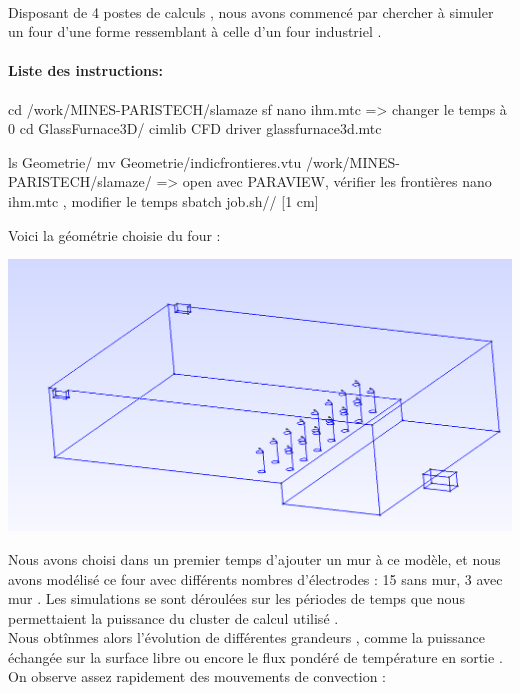 \documentclass[12pt, a4paper, french, BCOR = 0pt, DIV = 10]{scrartcl}
\begin{document}
	\paragraph{}
	 Disposant de 4 postes de calculs , nous avons commencé par chercher à simuler un four  d'une forme ressemblant à celle d'un four industriel .
	 
	 \paragraph{Liste des instructions:}
	 cd /work/MINES-PARISTECH/slamaze
	 sf
	 nano ihm.mtc => changer le temps à 0
	 cd GlassFurnace3D/
	 cimlib CFD driver glassfurnace3d.mtc
	 
	 ls Geometrie/
	 mv Geometrie/indicfrontieres.vtu /work/MINES-PARISTECH/slamaze/ => open avec PARAVIEW, vérifier les frontières
	 nano ihm.mtc , modifier le temps
	 sbatch job.sh// [1 cm]
	 
	 Voici la géométrie choisie du four :
	 
	 \includegraphics[scale=0.5]{Géométrie fours}
	 
	 Nous avons choisi dans un premier temps d'ajouter un mur à ce modèle, et nous avons modélisé ce four avec différents nombres d'électrodes : 15 sans mur, 3 avec mur . Les simulations se sont déroulées sur les périodes de temps que nous permettaient la puissance du cluster de calcul utilisé . \\
	 
	 Nous obtînmes alors l'évolution de différentes grandeurs , comme la puissance échangée sur la surface libre ou encore le flux pondéré de température en sortie  . \\
	 
	 On observe assez rapidement des mouvements de convection : 
	 
 
	
	
\end{document}
